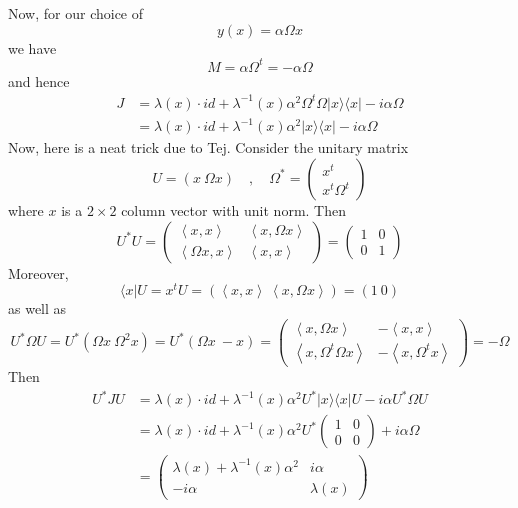 \documentclass[a4paper,11pt]{article}
\theoremstyle{definition}
\newcommand{\ket}[1]{\lvert #1 \rangle}
\newcommand{\bra}[1]{\langle #1 \rvert}
\newcommand{\mat}[4]{\begin{pmatrix} #1 & #2 \\ #3 & #4 \end{pmatrix}}
\begin{document}
Now, for our choice of
\[
  y(x) = \alpha \Omega x
\] 
we have
\begin{equation}
  M = \alpha \Omega^t = - \alpha \Omega
\end{equation}
and hence 
\begin{equation}
  \begin{split} 
    J &= \lambda(x) \cdot id + \lambda^{-1}(x) \alpha^2 \Omega^t \Omega \ket{x} \bra{x} - i \alpha \Omega \\
    &= \lambda(x) \cdot id + \lambda^{-1}(x) \alpha^2 \ket{x} \bra{x} - i \alpha \Omega
  \end{split}
\end{equation}
Now, here is a neat trick due to Tej.
Consider the unitary matrix 
\begin{equation}
  U = (x\ \Omega x) \quad , \quad \Omega^{*} = \begin{pmatrix} x^t \\ x^t \Omega^t \end{pmatrix}
\end{equation}
where $x$ is a $2\times 2$ column vector with unit norm.
Then 
\begin{equation}
  U^* U = \mat{\left\langle x, x \right\rangle}{\left\langle x, \Omega x \right\rangle}{\left\langle \Omega x, x \right\rangle}{\left\langle x, x \right\rangle} = \mat{1}{0}{0}{1}
\end{equation}
Moreover,
\begin{equation}
  \bra{x} U = x^t U = (\left\langle x,x \right\rangle\  \left\langle x, \Omega x \right\rangle) = (1\ 0)
\end{equation}
as well as
\begin{equation}
  U^* \Omega U = U^* (\Omega x\ \Omega^2 x) = U^* (\Omega x\ -x) = \mat{\left\langle x, \Omega x \right\rangle}{-\left\langle x, x \right\rangle}{\left\langle x, \Omega^t\Omega x\right\rangle}{-\left\langle x, \Omega^t x \right\rangle} = -\Omega
\end{equation}
Then
\begin{equation}
  \begin{split} 
    U^* J U &= \lambda(x) \cdot id + \lambda^{-1}(x) \alpha^2 U^* \ket{x}\bra{x} U - i\alpha U^* \Omega U \\
    &= \lambda(x) \cdot id + \lambda^{-1}(x) \alpha^2 U^* \mat{1}{0}{0}{0} + i\alpha \Omega \\
    &= \mat{\lambda(x) + \lambda^{-1}(x) \alpha^2}{i\alpha}{-i\alpha}{\lambda(x)}
  \end{split}
\end{equation}
\end{document}
